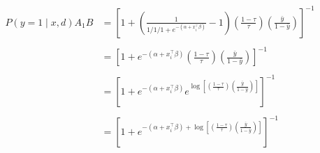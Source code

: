 \begin{align*}
    P(y=1 \mid x, d) A_1 B &= \left[ 1 + \left(\frac{1}{1/1/1+e^{-(\alpha + x_i^\intercal \beta)}} - 1\right) \left(\frac{1 - \tau}{\tau}\right) \left(\frac{\bar{y}}{1-\bar{y}}\right) \right]^{-1}\\
    \\
    &= \left[ 1 + e^{-(\alpha + x_i^\intercal \beta)} \left(\frac{1 - \tau}{\tau}\right) \left(\frac{\bar{y}}{1-\bar{y}}\right) \right]^{-1}\\
    \\
    &= \left[ 1 + e^{-(\alpha + x_i^\intercal \beta)} e^{\log\left[ {\left(\frac{1 - \tau}{\tau}\right) \left(\frac{\bar{y}}{1-\bar{y}}\right)}\right]} \right]^{-1}\\
    \\
    &= \left[ 1 + e^{-(\alpha + x_i^\intercal \beta) + \log\left[ {\left(\frac{1 - \tau}{\tau}\right) \left(\frac{\bar{y}}{1-\bar{y}}\right)}\right]} \right]^{-1}
\end{align*}

